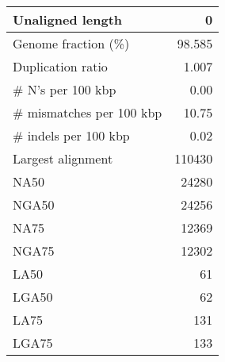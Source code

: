 \documentclass[12pt,a4paper]{article}
\begin{document}
\begin{table}[ht]
\begin{center}
\begin{tabular}{|l*{1}{|r}|}
Unaligned length & 0 \\ \hline
Genome fraction (\%) & 98.585 \\ \hline
Duplication ratio & 1.007 \\ \hline
\# N's per 100 kbp & 0.00 \\ \hline
\# mismatches per 100 kbp & 10.75 \\ \hline
\# indels per 100 kbp & 0.02 \\ \hline
Largest alignment & 110430 \\ \hline
NA50 & 24280 \\ \hline
NGA50 & 24256 \\ \hline
NA75 & 12369 \\ \hline
NGA75 & 12302 \\ \hline
LA50 & 61 \\ \hline
LGA50 & 62 \\ \hline
LA75 & 131 \\ \hline
LGA75 & 133 \\ \hline
\end{tabular}
\end{center}
\end{table}
\end{document}
